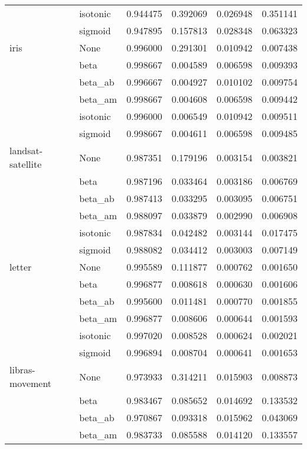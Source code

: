 \begin{tabular}{llrrrr}
        & isotonic &  0.944475 &  0.392069 &  0.026948 &  0.351141 \\
        & sigmoid &  0.947895 &  0.157813 &  0.028348 &  0.063323 \\
iris & None &  0.996000 &  0.291301 &  0.010942 &  0.007438 \\
        & beta &  0.998667 &  0.004589 &  0.006598 &  0.009393 \\
        & beta\_ab &  0.996667 &  0.004927 &  0.010102 &  0.009754 \\
        & beta\_am &  0.998667 &  0.004608 &  0.006598 &  0.009442 \\
        & isotonic &  0.996000 &  0.006549 &  0.010942 &  0.009511 \\
        & sigmoid &  0.998667 &  0.004611 &  0.006598 &  0.009485 \\
landsat-satellite & None &  0.987351 &  0.179196 &  0.003154 &  0.003821 \\
        & beta &  0.987196 &  0.033464 &  0.003186 &  0.006769 \\
        & beta\_ab &  0.987413 &  0.033295 &  0.003095 &  0.006751 \\
        & beta\_am &  0.988097 &  0.033879 &  0.002990 &  0.006908 \\
        & isotonic &  0.987834 &  0.042482 &  0.003144 &  0.017475 \\
        & sigmoid &  0.988082 &  0.034412 &  0.003003 &  0.007149 \\
letter & None &  0.995589 &  0.111877 &  0.000762 &  0.001650 \\
        & beta &  0.996877 &  0.008618 &  0.000630 &  0.001606 \\
        & beta\_ab &  0.995600 &  0.011481 &  0.000770 &  0.001855 \\
        & beta\_am &  0.996877 &  0.008606 &  0.000644 &  0.001593 \\
        & isotonic &  0.997020 &  0.008528 &  0.000624 &  0.002021 \\
        & sigmoid &  0.996894 &  0.008704 &  0.000641 &  0.001653 \\
libras-movement & None &  0.973933 &  0.314211 &  0.015903 &  0.008873 \\
        & beta &  0.983467 &  0.085652 &  0.014692 &  0.133532 \\
        & beta\_ab &  0.970867 &  0.093318 &  0.015962 &  0.043069 \\
        & beta\_am &  0.983733 &  0.085588 &  0.014120 &  0.133557 \\

\end{tabular}

